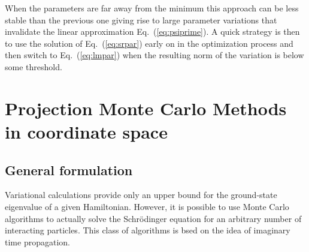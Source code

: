 When the parameters are far away from the minimum this approach can be less stable 
than the previous one giving rise to large parameter variations that
invalidate the linear approximation Eq.~(\ref{eq:psiprime}). A quick strategy is then to use 
the solution of Eq.~(\eqref{eq:srpar}) early on in the optimization process and then switch to
Eq.~(\eqref{eq:lmpar}) when the resulting norm of the variation is below some threshold.

\section{Projection Monte Carlo Methods in coordinate space}
\subsection{General formulation}
\label{sec:generaldmc}
Variational calculations provide only an upper bound for the ground-state eigenvalue of a 
given Hamiltonian. However, it is possible to use Monte Carlo algorithms to actually solve
the Schr\"odinger equation for an arbitrary number of interacting particles. This class of algorithms is bsed on the idea of imaginary time propagation.

